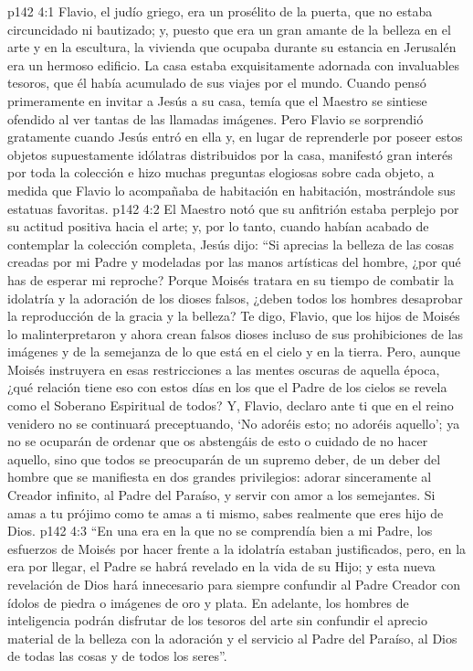 \vs p142 4:1 Flavio, el judío griego, era un prosélito de la puerta, que no estaba circuncidado ni bautizado; y, puesto que era un gran amante de la belleza en el arte y en la escultura, la vivienda que ocupaba durante su estancia en Jerusalén era un hermoso edificio. La casa estaba exquisitamente adornada con invaluables tesoros, que él había acumulado de sus viajes por el mundo. Cuando pensó primeramente en invitar a Jesús a su casa, temía que el Maestro se sintiese ofendido al ver tantas de las llamadas imágenes. Pero Flavio se sorprendió gratamente cuando Jesús entró en ella y, en lugar de reprenderle por poseer estos objetos supuestamente idólatras distribuidos por la casa, manifestó gran interés por toda la colección e hizo muchas preguntas elogiosas sobre cada objeto, a medida que Flavio lo acompañaba de habitación en habitación, mostrándole sus estatuas favoritas.
\vs p142 4:2 El Maestro notó que su anfitrión estaba perplejo por su actitud positiva hacia el arte; y, por lo tanto, cuando habían acabado de contemplar la colección completa, Jesús dijo: “Si aprecias la belleza de las cosas creadas por mi Padre y modeladas por las manos artísticas del hombre, ¿por qué has de esperar mi reproche? Porque Moisés tratara en su tiempo de combatir la idolatría y la adoración de los dioses falsos, ¿deben todos los hombres desaprobar la reproducción de la gracia y la belleza? Te digo, Flavio, que los hijos de Moisés lo malinterpretaron y ahora crean falsos dioses incluso de sus prohibiciones de las imágenes y de la semejanza de lo que está en el cielo y en la tierra. Pero, aunque Moisés instruyera en esas restricciones a las mentes oscuras de aquella época, ¿qué relación tiene eso con estos días en los que el Padre de los cielos se revela como el Soberano Espiritual de todos? Y, Flavio, declaro ante ti que en el reino venidero no se continuará preceptuando, ‘No adoréis esto; no adoréis aquello’; ya no se ocuparán de ordenar que os abstengáis de esto o cuidado de no hacer aquello, sino que todos se preocuparán de un supremo deber, de un deber del hombre que se manifiesta en dos grandes privilegios: adorar sinceramente al Creador infinito, al Padre del Paraíso, y servir con amor a los semejantes. Si amas a tu prójimo como te amas a ti mismo, sabes realmente que eres hijo de Dios.
\vs p142 4:3 “En una era en la que no se comprendía bien a mi Padre, los esfuerzos de Moisés por hacer frente a la idolatría estaban justificados, pero, en la era por llegar, el Padre se habrá revelado en la vida de su Hijo; y esta nueva revelación de Dios hará innecesario para siempre confundir al Padre Creador con ídolos de piedra o imágenes de oro y plata. En adelante, los hombres de inteligencia podrán disfrutar de los tesoros del arte sin confundir el aprecio material de la belleza con la adoración y el servicio al Padre del Paraíso, al Dios de todas las cosas y de todos los seres”.
